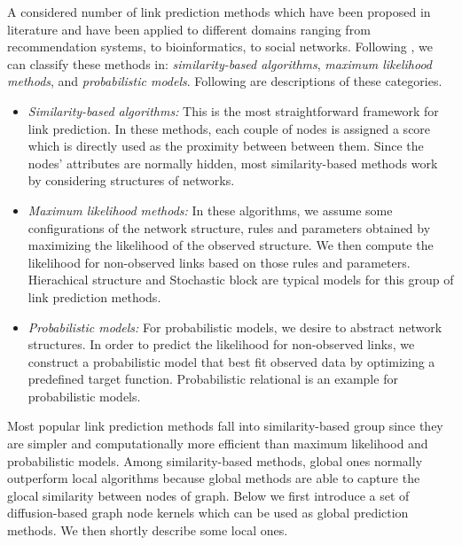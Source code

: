 \documentclass{article}
\begin{document}
A considered number of link prediction methods which have been proposed in literature and have been applied to different domains ranging from recommendation systems, to bioinformatics, to social networks. Following \cite{link-prediction}, we can classify these methods in: \textit{similarity-based algorithms}, \textit{maximum likelihood methods}, and \textit{probabilistic models}. Following are descriptions of these categories.
\begin{itemize}
\item \textit{Similarity-based algorithms:} This is the most straightforward framework for link prediction. In these methods, each couple of nodes is assigned a score which is directly used as the proximity between between them. Since the nodes' attributes are normally hidden, most similarity-based methods work by considering structures of networks.

\item \textit{Maximum likelihood methods:} In these algorithms, we assume some configurations of the network structure, rules and parameters obtained by maximizing the likelihood of the observed structure. We then compute the likelihood for non-observed links based on those rules and parameters. Hierachical structure \cite{hierachical-structure} and Stochastic block \cite{stochastic-block} are typical models for this group of link prediction methods.

\item \textit{Probabilistic models:} For probabilistic models, we desire to abstract network structures. In order to predict the likelihood for non-observed links, we construct a probabilistic model that best fit observed data by optimizing a predefined target function. Probabilistic relational \cite{probabilistic-relational} is an example for probabilistic models.
\end{itemize}

Most popular link prediction methods fall into similarity-based group since they are simpler and computationally more efficient than maximum likelihood and probabilistic models. Among similarity-based methods, global ones normally outperform local algorithms because global methods are able to capture the glocal similarity between nodes of graph. Below we first introduce a set of diffusion-based graph node kernels which can be used as global prediction methods. We then shortly describe some local ones.
\end{document}
